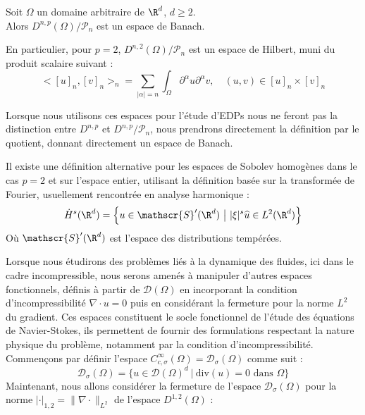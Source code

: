 \begin{theorembox}
\begin{theorem}
    Soit $\Omega$ un domaine arbitraire de $\R^d$,  $d \geq 2$.  \\
    Alors $D^{n,p}(\Omega)/\mathscr{P}_n$ est un espace de Banach.

    \vspace{1em}

    En particulier, pour $p = 2$, $D^{n,2}(\Omega)/\mathscr{P}_n$ est un espace de Hilbert, muni du produit scalaire suivant :
    $$ \big< [u]_n, [v]_n \big>_n = \sum_{|\alpha| = n} \int_{\Omega} \partial^{\alpha}u \partial^{\alpha}v, \quad (u,v) \in [u]_n \times [v]_n $$

\end{theorem}
\end{theorembox}
Lorsque nous utilisons ces espaces pour l'étude d'EDPs nous ne feront pas la distinction entre $D^{n,p}$ et $D^{n,p}/\mathscr{P}_n$, nous prendrons directement la définition par le quotient, donnant directement un espace de Banach.
\begin{remarkbox}
\begin{remark}
    Il existe une définition alternative pour les espaces de Sobolev homogènes dans le cas $p = 2$ et sur l'espace entier, utilisant la définition basée sur la transformée de Fourier, usuellement rencontrée en analyse harmonique :
    $$\dot{H}^s(\R^d) = \Big\{ u \in \mathscr{S}'(\R^d) \ \big| \ |\xi|^s \widehat{u} \in L^2(\R^d) \Big\} $$
    Où $\mathscr{S}'(\R^d)$ est l'espace des distributions tempérées.
\end{remark}
\end{remarkbox}
Lorsque nous étudirons des problèmes liés à la dynamique des fluides, ici dans le cadre incompressible, nous serons amenés à manipuler d'autres espaces fonctionnels, définis à partir de $\mathcal{D}(\Omega)$ en incorporant la condition d'incompressibilité $\nabla \cdot u = 0$ puis en considérant la fermeture pour la norme $L^2$ du gradient.
Ces espaces constituent le socle fonctionnel de l'étude des équations de Navier-Stokes, ils permettent de fournir des formulations respectant la nature physique du problème, notamment par la condition d'incompressibilité.
Commençons par définir l'espace $C^{\infty}_{c,\sigma}(\Omega) = \mathcal{D}_{\sigma}(\Omega)$ comme suit :
$$ \mathcal{D}_{\sigma}(\Omega) = \Big\{ u \in \mathcal{D}(\Omega)^d \ | \ \text{div}(u) = 0 \text{ dans } \Omega \Big\} $$
Maintenant, nous allons considérer la fermeture de l'espace $\mathcal{D}_{\sigma}(\Omega)$ pour la norme $|\cdot|_{1,2} = \|\nabla \cdot \|_{L^2} $ de l'espace $D^{1,2}(\Omega)$ :
